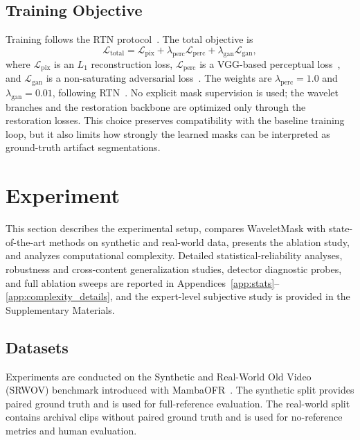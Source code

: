 {\subsection{Training Objective}\label{subsec:training}

Training follows the RTN protocol~\cite{rtn2022}. The total objective is
\begin{equation}\label{eq:loss_total}
    \mathcal{L}_{\mathrm{total}}=\mathcal{L}_{\mathrm{pix}}+\lambda_{\mathrm{perc}}\mathcal{L}_{\mathrm{perc}}+\lambda_{\mathrm{gan}}\mathcal{L}_{\mathrm{gan}},
\end{equation}
where $\mathcal{L}_{\mathrm{pix}}$ is an $L_1$ reconstruction loss, $\mathcal{L}_{\mathrm{perc}}$ is a VGG-based perceptual loss~\cite{johnson2016perceptual,simonyan2014vgg}, and $\mathcal{L}_{\mathrm{gan}}$ is a non-saturating adversarial loss~\cite{goodfellow2014gan}. The weights are $\lambda_{\mathrm{perc}}=1.0$ and $\lambda_{\mathrm{gan}}=0.01$, following RTN~\cite{rtn2022}. No explicit mask supervision is used; the wavelet branches and the restoration backbone are optimized only through the restoration losses. This choice preserves compatibility with the baseline training loop, but it also limits how strongly the learned masks can be interpreted as ground-truth artifact segmentations.


\section{Experiment}\label{sec:results}

This section describes the experimental setup, compares WaveletMask with state-of-the-art methods on synthetic and real-world data, presents the ablation study, and analyzes computational complexity. Detailed statistical-reliability analyses, robustness and cross-content generalization studies, detector diagnostic probes, and full ablation sweeps are reported in Appendices~\ref{app:stats}--\ref{app:complexity_details}, and the expert-level subjective study is provided in the Supplementary Materials.

\subsection{Datasets}

Experiments are conducted on the Synthetic and Real-World Old Video (SRWOV) benchmark introduced with MambaOFR~\cite{mao2025mambaofr}. The synthetic split provides paired ground truth and is used for full-reference evaluation. The real-world split contains archival clips without paired ground truth and is used for no-reference metrics and human evaluation.

}
